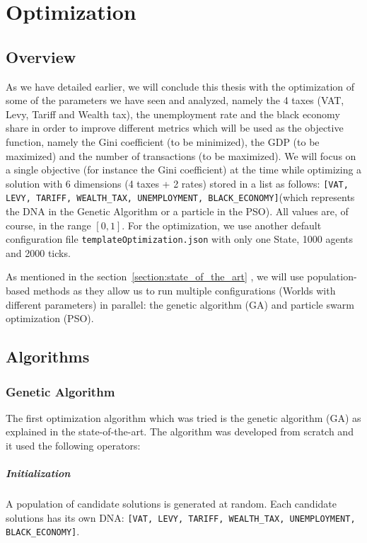 \chapter{Optimization}

\section{Overview}
    As we have detailed earlier, we will conclude this thesis with the optimization of some of the parameters we have seen and analyzed, namely the 4 taxes (VAT, Levy, Tariff and Wealth tax), the unemployment rate and the black economy share in order to improve different metrics which will be used as the objective function, namely the Gini coefficient (to be minimized), the GDP (to be maximized) and the number of transactions (to be maximized). We will focus on a single objective (for instance the Gini coefficient) at the time while optimizing a solution with 6 dimensions (4 taxes + 2 rates) stored in a list as follows: \texttt{[VAT, LEVY, TARIFF, WEALTH\_TAX, UNEMPLOYMENT, BLACK\_ECONOMY]}(which represents the DNA in the Genetic Algorithm or a particle in the PSO). All values are, of course, in the range $[0, 1]$. For the optimization, we use another default configuration file \texttt{templateOptimization.json} with only one State, 1000 agents and 2000 ticks.
    
    As mentioned in the section~\ref{section:state_of_the_art} , we will use population-based methods as they allow us to run multiple configurations (Worlds with different parameters) in parallel: the genetic algorithm (GA) and particle swarm optimization (PSO).

\section{Algorithms}

    \subsection{Genetic Algorithm}

    The first optimization algorithm which was tried is the genetic algorithm (GA) as explained in the state-of-the-art. The algorithm was developed from scratch and it used the following operators:

        \paragraph{Initialization} A population of candidate solutions is generated at random. Each candidate solutions has its own DNA: \texttt{[VAT, LEVY, TARIFF, WEALTH\_TAX, UNEMPLOYMENT, BLACK\_ECONOMY]}.


